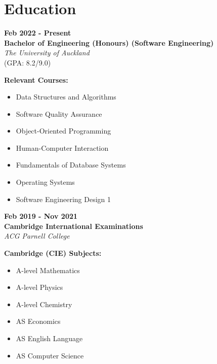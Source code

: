 \documentclass[a4paper,12pt]{article}
\begin{document}
\section{Education}

\begin{minipage}[t]{0.45\textwidth}
\textbf{Feb 2022 - Present} \\
\textbf{Bachelor of Engineering (Honours) (Software Engineering)} \\
\textit{The University of Auckland} \\
(GPA: 8.2/9.0)
\end{minipage}
\hfill
\begin{minipage}[t]{0.45\textwidth}
\textbf{Relevant Courses:}
\begin{itemize}
    \item Data Structures and Algorithms
    \item Software Quality Assurance
    \item Object-Oriented Programming
    \item Human-Computer Interaction
    \item Fundamentals of Database Systems
    \item Operating Systems
    \item Software Engineering Design 1
\end{itemize}
\end{minipage}

\vspace{0.5cm} %

\begin{minipage}[t]{0.45\textwidth}
\textbf{Feb 2019 - Nov 2021} \\
\textbf{Cambridge International Examinations} \\
\textit{ACG Parnell College} \\
\end{minipage}
\hfill
\begin{minipage}[t]{0.45\textwidth}
\textbf{Cambridge (CIE) Subjects:}
\begin{itemize}
    \item A-level Mathematics
    \item A-level Physics
    \item A-level Chemistry
    \item AS Economics
    \item AS English Language
    \item AS Computer Science
\end{itemize}
\end{minipage}
\end{document}
